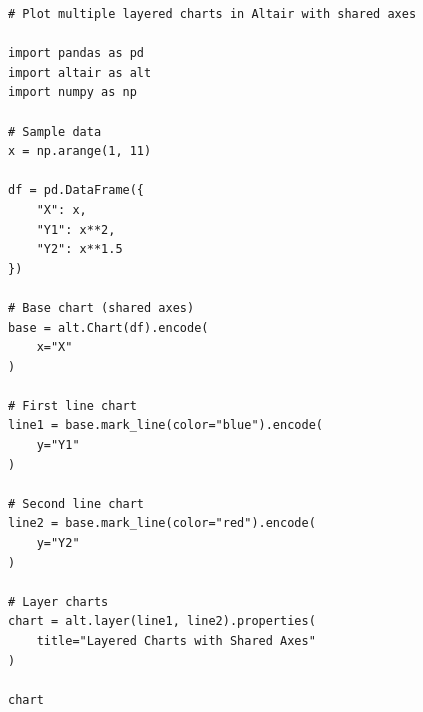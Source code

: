 \begin{verbatim}
# Plot multiple layered charts in Altair with shared axes

import pandas as pd
import altair as alt
import numpy as np

# Sample data
x = np.arange(1, 11)

df = pd.DataFrame({
    "X": x,
    "Y1": x**2,
    "Y2": x**1.5
})

# Base chart (shared axes)
base = alt.Chart(df).encode(
    x="X"
)

# First line chart
line1 = base.mark_line(color="blue").encode(
    y="Y1"
)

# Second line chart
line2 = base.mark_line(color="red").encode(
    y="Y2"
)

# Layer charts
chart = alt.layer(line1, line2).properties(
    title="Layered Charts with Shared Axes"
)

chart
\end{verbatim}